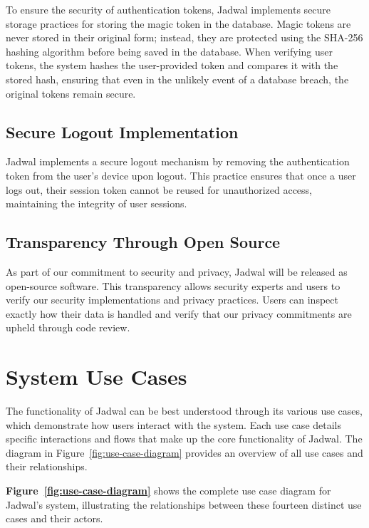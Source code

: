 \documentclass[12pt,a4paper,twoside]{report}
\begin{document}
To ensure the security of authentication tokens, Jadwal implements secure storage practices for storing the magic token in the database. Magic tokens are never stored in their original form; instead, they are protected using the SHA-256 hashing algorithm before being saved in the database. When verifying user tokens, the system hashes the user-provided token and compares it with the stored hash, ensuring that even in the unlikely event of a database breach, the original tokens remain secure.

\subsection{Secure Logout Implementation}

Jadwal implements a secure logout mechanism by removing the authentication token from the user's device upon logout. This practice ensures that once a user logs out, their session token cannot be reused for unauthorized access, maintaining the integrity of user sessions.

\subsection{Transparency Through Open Source}

As part of our commitment to security and privacy, Jadwal will be released as open-source software. This transparency allows security experts and users to verify our security implementations and privacy practices. Users can inspect exactly how their data is handled and verify that our privacy commitments are upheld through code review.


\section{System Use Cases}
The functionality of Jadwal can be best understood through its various use cases, which demonstrate how users interact with the system. Each use case details specific interactions and flows that make up the core functionality of Jadwal. The diagram in Figure~\ref{fig:use-case-diagram} provides an overview of all use cases and their relationships.

\textbf{Figure~\ref{fig:use-case-diagram}} shows the complete use case diagram for Jadwal's system, illustrating the relationships between these fourteen distinct use cases and their actors.
\end{document}
